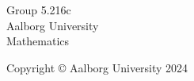 \begin{titlepage}
\begin{figure}[ht]
    \end{figure}
    \setlength\fboxsep{5pt}
  \vfill
\begin{center}
  {\large{Group 5.216c} \\
    {Aalborg University} \\
    {Mathematics} \\}
\end{center}
  
\end{titlepage}
\clearpage

\thispagestyle{empty}
{\small
\strut\vfill %
\noindent Copyright \copyright{} Aalborg University 2024\par
\vspace{0.2cm}
}
\clearpage

